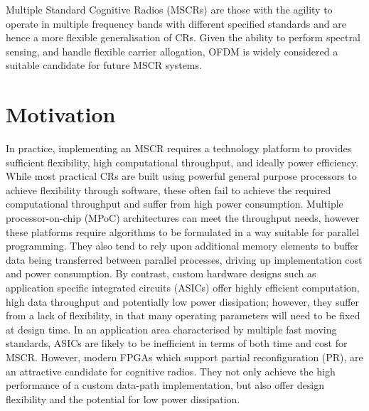  Multiple Standard Cognitive Radios (MSCRs) are those with the agility to operate in multiple frequency bands with different specified standards and are hence a more flexible generalisation of CRs.%
Given the ability to perform spectral sensing, and handle flexible carrier allogation, OFDM is widely considered a suitable candidate for future MSCR systems.

\section{Motivation}

In practice, implementing an MSCR requires a technology platform to provides sufficient flexibility, high computational throughput, and ideally power efficiency.
While most practical CRs are built using powerful general purpose processors to achieve flexibility through software, these often fail to achieve the required computational throughput and suffer from high power consumption.
Multiple processor-on-chip (MPoC) architectures can meet the throughput needs, however these platforms require algorithms to be formulated in a way suitable for parallel programming. 
They also tend to rely upon additional memory elements to buffer data being transferred between parallel processes, driving up implementation cost and power consumption.
By contrast, custom hardware designs such as application specific integrated circuits (ASICs) offer highly efficient computation, high data throughput and potentially low power dissipation; however, they suffer from a lack of flexibility, in that many operating parameters will need to be fixed at design time.
In an application area characterised by multiple fast moving standards, ASICs are likely to be inefficient in terms of both time and cost for MSCR.
However, modern FPGAs which support partial reconfiguration (PR), are an attractive candidate for cognitive radios.
They not only achieve the high performance of a custom data-path implementation, but also offer design flexibility and the potential for low power dissipation.

